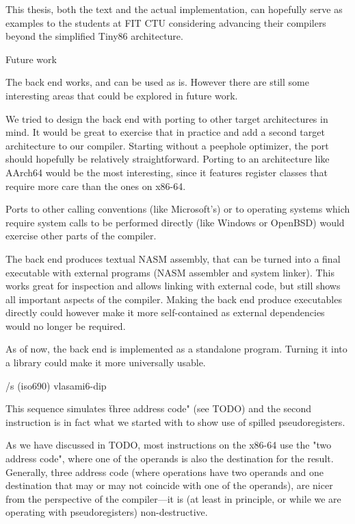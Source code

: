 This thesis, both the text and the actual implementation, can hopefully serve as
examples to the students at FIT CTU considering advancing their compilers beyond
the simplified Tiny86 architecture.

\sec Future work

The back end works, and can be used as is. However there are still some
interesting areas that could be explored in future work.

We tried to design the back end with porting to other target architectures in
mind. It would be great to exercise that in practice and add a second target
architecture to our compiler. Starting without a peephole optimizer, the port
should hopefully be relatively straightforward. Porting to an architecture like
AArch64 would be the most interesting, since it features register classes that
require more care than the ones on x86-64.

Ports to other calling conventions (like Microsoft's) or to operating systems
which require system calls to be performed directly (like Windows or OpenBSD)
would exercise other parts of the compiler.

The back end produces textual NASM assembly, that can be turned into a final
executable with external programs (NASM assembler and system linker). This works
great for inspection and allows linking with external code, but still shows all
important aspects of the compiler. Making the back end produce executables
directly could however make it more self-contained as external dependencies
would no longer be required.

As of now, the back end is implemented as a standalone program. Turning it into a
library could make it more universally usable.

\bibchap
\usebib/s (iso690) vlasami6-dip

\bye

This sequence simulates \"three address code" (see TODO) and the second instruction
is in fact what we started with to show use of spilled pseudoregisters.


As we have discussed in TODO, most instructions on
the x86-64 use the "two address code", where one of the operands is also the
destination for the result. Generally, three address code (where operations have
two operands and one destination that may or may not coincide with one of the
operands), are nicer from the perspective of the compiler---it is (at least in
principle, or while we are operating with pseudoregisters) non-destructive.





